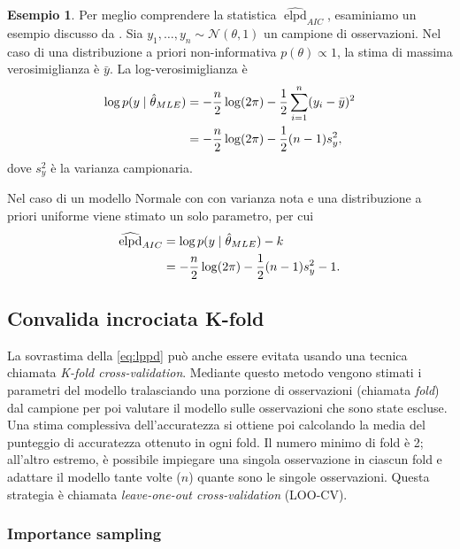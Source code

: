 \documentclass[
  10pt,
  italian,
  a4paper,
  extrafontsizes,onecolumn,openright
  ]{memoir}
\DeclareMathOperator{\elpd}{elpd} %
\theoremstyle{definition}
\theoremstyle{definition}
\newtheorem{example}{Esempio}[chapter]
\theoremstyle{definition}
\theoremstyle{definition}
\theoremstyle{remark}
\begin{document}
\begin{example}

Per meglio comprendere la statistica \(\widehat{\elpd}_{AIC}\), esaminiamo un esempio discusso da \textcite{gelman2014understanding}. Sia \(y_1, \dots, y_n \sim \mathcal{N}(\theta, 1)\) un campione di osservazioni. Nel caso di una distribuzione a priori non-informativa \(p(\theta) \propto 1\), la stima di massima verosimiglianza è \(\bar{y}\). La log-verosimiglianza è
\begin{align}
\log p(y \mid \hat{\theta}_{MLE}) &= -\frac{n}{2} \log (2\pi) - \frac{1}{2}\sum_{i=1}^n (y_i - \bar{y})^2 \notag\\
&= -\frac{n}{2} \log (2\pi) - \frac{1}{2} (n-1)s_y^2,
\end{align}
\noindent
dove \(s_y^2\) è la varianza campionaria.

Nel caso di un modello Normale con con varianza nota e una distribuzione a priori uniforme viene stimato un solo parametro, per cui
\begin{align}
\widehat{\elpd}_{AIC} &= \log p(y \mid \hat{\theta}_{MLE}) - k \notag \\
&= -\frac{n}{2} \log (2\pi) - \frac{1}{2} (n-1)s_y^2 - 1.
\end{align}

\end{example}

\hypertarget{convalida-incrociata-k-fold}{%
\subsection{Convalida incrociata K-fold}\label{convalida-incrociata-k-fold}}

La sovrastima della \eqref{eq:lppd} può anche essere evitata usando una tecnica chiamata \emph{K-fold cross-validation}. Mediante questo metodo vengono stimati i parametri del modello tralasciando una porzione di osservazioni (chiamata \emph{fold}) dal campione per poi valutare il modello sulle osservazioni che sono state escluse. Una stima complessiva dell'accuratezza si ottiene poi calcolando la media del punteggio di accuratezza ottenuto in ogni fold. Il numero minimo di fold è 2; all'altro estremo, è possibile impiegare una singola osservazione in ciascun fold e adattare il modello tante volte (\(n\)) quante sono le singole osservazioni. Questa strategia è chiamata \emph{leave-one-out cross-validation} (LOO-CV).

\hypertarget{importance-sampling}{%
\subsubsection{Importance sampling}\label{importance-sampling}}
\end{document}
